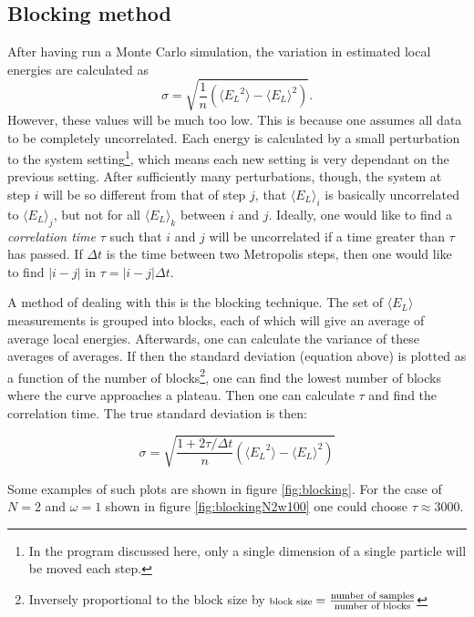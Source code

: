 \documentclass[english, a4paper]{article}
\newcommand\lr[1]{\left(#1\right)}
\begin{document}
	\subsection{Blocking method} \label{blockingTheory}
	
	After having run a Monte Carlo simulation, the variation in estimated local energies are calculated as
	\begin{equation}
		\sigma = \sqrt{\frac{1}{n}\lr{\langle {E_L}^2 \rangle - \langle E_L \rangle^2}}. \label{uncorelatedVariance}
	\end{equation} 
	However, these values will be much too low.
	This is because one assumes all data to be completely uncorrelated. Each energy is calculated by a small perturbation to the system setting\footnote{In the program discussed here, only a single dimension of a single particle will be moved each step.}, which means each new setting is very dependant on the previous setting. After sufficiently many perturbations, though, the system at step $i$ will be so different from that of step $j$, that $\langle E_L\rangle_i$ is basically uncorrelated to  $\langle E_L\rangle_j$, but not for all $\langle E_L\rangle_k$ between $i$ and $j$. Ideally, one would like to find a \emph{correlation time} $\tau$ such that $i$ and $j$ will be uncorrelated if a time greater than $\tau$ has passed. If $\Delta t$ is the time between two Metropolis steps, then one would like to find $|i-j|$ in $\tau = |i-j|\Delta t$.
	
	A method of dealing with this is the blocking technique. The set of $\langle E_L\rangle$ measurements is grouped into blocks, each of which will give an average of average local energies. Afterwards, one can calculate the variance of these averages of averages. If then the standard deviation (equation above) is plotted as a function of the number of blocks\footnote{Inversely proportional to the block size by $\text{\scriptsize block size} = \frac{\text{number of samples}}{\text{number of blocks}}$}, one can find the lowest number of blocks where the curve approaches a plateau. Then one can calculate $\tau$ and find the correlation time. The true standard deviation is then:
	
	\begin{equation}
		\sigma=\sqrt{\frac{1+2\tau/\Delta t}{n}\left(\langle {E_L}^2\rangle-\langle E_L\rangle^2\right)}
	\end{equation}
	
	Some examples of such plots are shown in figure \ref{fig:blocking}. For the case of $N=2$ and $\omega=1$ shown in figure \ref{fig:blockingN2w100} one could choose $\tau \approx 3000$.
\end{document}

